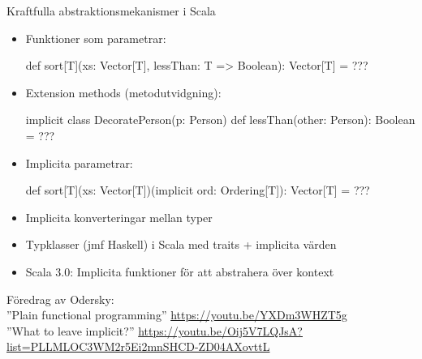 \begin{Slide}{Kraftfulla abstraktionsmekanismer i Scala}\SlideFontTiny
\setlength{\leftmargini}{-1em}
\begin{itemize}
\item Funktioner som parametrar:
\begin{Code}
def sort[T](xs: Vector[T], lessThan: T => Boolean): Vector[T] = ???
\end{Code}

\item Extension methods (metodutvidgning):
\begin{Code}
implicit class DecoratePerson(p: Person) {
  def lessThan(other: Person): Boolean = ???
}
\end{Code}

\item Implicita parametrar:
\begin{Code}
def sort[T](xs: Vector[T])(implicit ord: Ordering[T]): Vector[T] = ???
\end{Code}

\item Implicita konverteringar mellan typer

\item Typklasser (jmf Haskell) i Scala med traits + implicita värden

\item Scala 3.0: Implicita funktioner för att abstrahera över kontext

\end{itemize}
{\noindent\tiny Föredrag av Odersky: \\
''Plain functional programming'' \url{https://youtu.be/YXDm3WHZT5g}\\
''What to leave implicit?'' \url{https://youtu.be/Oij5V7LQJsA?list=PLLMLOC3WM2r5Ei2mnSHCD-ZD04AXovttL}}
\end{Slide}



